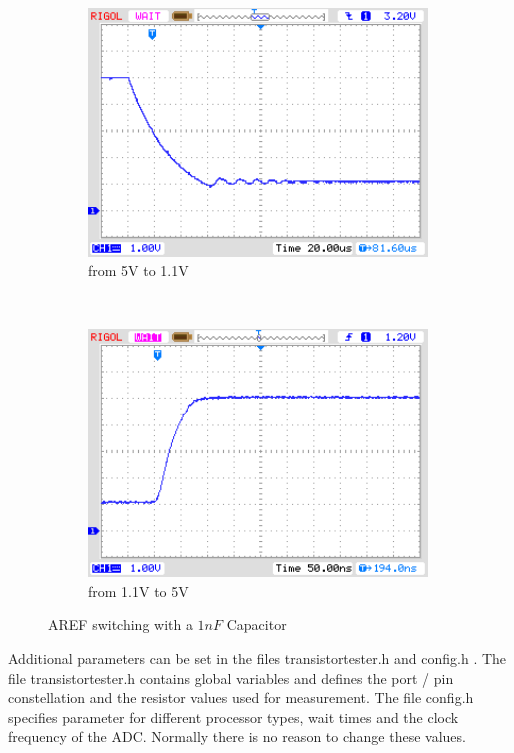 \begin{description}
\end{description}

\begin{figure}[H]
  \begin{subfigure}[b]{9cm}
    \centering
    \includegraphics[width=9cm]{../PNG/AREF2_1V.png}
    \caption{from 5V to 1.1V }
    \label{pic:aref1}
  \end{subfigure}
  ~
  \begin{subfigure}[b]{9cm}
    \centering
    \includegraphics[width=9cm]{../PNG/AREF2VCC.png}
    \caption{from 1.1V to 5V}
    \label{pic:aref5}
  \end{subfigure}
  \caption{AREF switching with a \(1nF\) Capacitor}
\end{figure}


Additional parameters can be set in the files transistortester.h and config.h .
The file transistortester.h contains global variables and defines the port / pin constellation
and the resistor values used for measurement.
The file config.h specifies parameter for different processor types, wait times and the clock
frequency of the ADC. Normally there is no reason to change these values.
